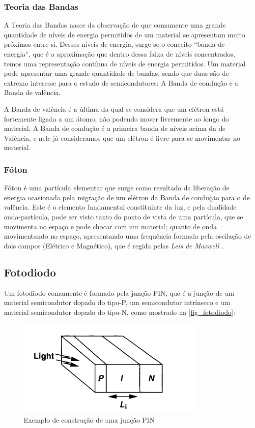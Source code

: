 \subsubsection{Teoria das Bandas}

A Teoria das Bandas nasce da observação de que comumente uma grande quantidade de níveis de energia permitidos de um material se apresentam muito próximos entre si. Desses níveis de energia, surge-se o conceito “banda de energia”, que \'e a aproximação que dentro dessa faixa de níveis concentrados, temos uma representação contínua de níveis de energia permitidos. Um material pode apresentar uma grande quantidade de bandas, sendo que duas são de extremo interesse para o estudo de semicondutores: A Banda de condução e a Banda de valência.

A Banda de valência \'e a última da qual se considera que um el\'etron está fortemente ligada a um átomo, não podendo mover livremente ao longo do material. A Banda de condução \'e a primeira banda de níveis acima da de Valência, e nele já consideramos que um el\'etron \'e livre para se movimentar no material.

\subsubsection{Fóton}

Fóton \'e uma partícula elementar que surge como resultado da liberação de energia ocasionada pela migração de um el\'etron da Banda de condução para o de valência. Este \'e o elemento fundamental constituinte da luz, e pela dualidade onda-partícula, pode ser visto tanto do ponto de vista de uma partícula, que se movimenta no espaço e pode chocar com um material; quanto de onda movimentando no espaço, apresentando uma frequência formada pela oscilação de dois campos (El\'etrico e Magn\'etico), que \'e regida pelas \textit{Leis de Maxwell} \cite{Sze, JohnSingleton}.

\subsection{Fotodiodo}
\label{secao_fotodiodo}
Um fotodiodo comumente \'e formado pela junção PIN, que \'e a junção de um material semicondutor dopado do tipo-P, um semicondutor intrínseco e um material semicondutor dopado do tipo-N, como mostrado na \autoref{fig_fotodiodo}:

\begin{figure}[!h]
	\caption{\label{fig_fotodiodo}Exemplo de construção de uma junção PIN}
	\begin{center}
	    \includegraphics[scale=0.4]{Imagens/PIN.png}
	\end{center}
\end{figure}

